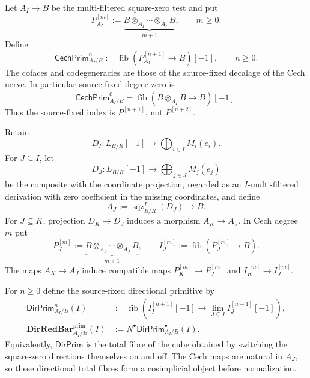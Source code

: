 \begin{definition}
\label{def:as-associative-primitive-bar}
Let $A_I\to B$ be the multi-filtered square-zero test and put
\[
    P_{A_I}^{[m]}
    :=
    \underbrace{B\otimes_{A_I}\cdots\otimes_{A_I}B}_{m+1},
    \qquad m\geq0.
\]
Define
\[
\boxed{
    \mathsf{CechPrim}^{n}_{A_I/B}
    :=
    \operatorname{fib}
    \left(
        P_{A_I}^{[n+1]}\longrightarrow B
    \right)[-1],
    \qquad n\geq0.
}
\]
The cofaces and codegeneracies are those of the source-fixed decalage of the
Cech nerve.  In particular source-fixed degree zero is
\[
    \mathsf{CechPrim}^{0}_{A_I/B}
    =
    \operatorname{fib}(B\otimes_{A_I}B\to B)[-1].
\]
Thus the source-fixed index is $P^{[n+1]}$, not $P^{[n+2]}$.
\end{definition}

\begin{construction}
\label{con:as-relative-operadic-bar-comparison}
Retain
\[
    D_I:
    L_{B/R}[-1]
    \longrightarrow
    \bigoplus_{i\in I}M_i(e_i).
\]
For $J\subseteq I$, let
\[
    D_J:
    L_{B/R}[-1]
    \longrightarrow
    \bigoplus_{j\in J}M_j(e_j)
\]
be the composite with the coordinate projection, regarded as an
$I$-multi-filtered derivation with zero coefficient in the missing
coordinates, and define
\[
\boxed{
    A_J:=\operatorname{sqz}^{I}_{B/R}(D_J)\longrightarrow B.
}
\]
For $J\subseteq K$, projection $D_K\to D_J$ induces a morphism
$A_K\to A_J$.  In Cech degree $m$ put
\[
    P_J^{[m]}
    :=
    \underbrace{B\otimes_{A_J}\cdots\otimes_{A_J}B}_{m+1},
    \qquad
    I_J^{[m]}
    :=
    \operatorname{fib}(P_J^{[m]}\to B).
\]
The maps $A_K\to A_J$ induce compatible maps
$P_K^{[m]}\to P_J^{[m]}$ and $I_K^{[m]}\to I_J^{[m]}$.

For $n\geq0$ define the source-fixed directional primitive by
\[
\boxed{
\begin{aligned}
    \mathsf{DirPrim}_{A_I/B}^{n}(I)
    &:={}
    \operatorname{fib}
    \left(
        I_I^{[n+1]}[-1]
        \longrightarrow
        \lim_{J\subsetneq I}I_J^{[n+1]}[-1]
    \right),\\
    \mathbf{DirRedBar}^{\mathrm{prim}}_{A_I/B}(I)
    &:={}
    N^\bullet\mathsf{DirPrim}_{A_I/B}^{\bullet}(I).
\end{aligned}}
\]
Equivalently, $\mathsf{DirPrim}$ is the total fibre of the cube obtained by
switching the square-zero directions themselves on and off.  The Cech maps
are natural in $A_J$, so these directional total fibres form a cosimplicial
object before normalization.
\end{construction}

